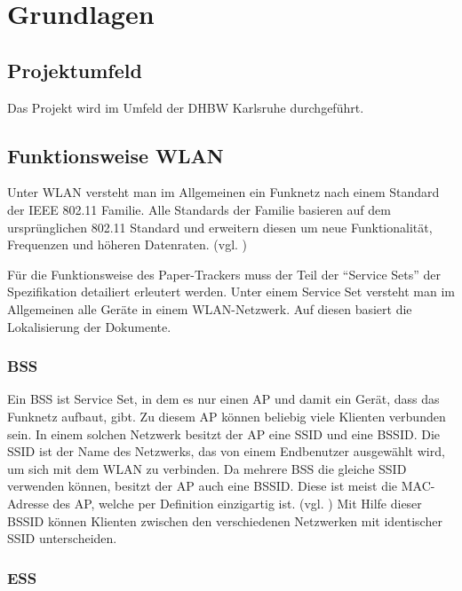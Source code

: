 \chapter{Grundlagen}

\section{Projektumfeld}

Das Projekt wird im Umfeld der \gls{DHBW} Karlsruhe durchgeführt.
\TODO{}

\section{Funktionsweise \gls{WLAN}} \label{sec:grundlagen-wlan}

Unter \gls{WLAN} versteht man im Allgemeinen ein Funknetz nach einem Standard der \gls{IEEE} 802.11 Familie.
Alle Standards der Familie basieren auf dem ursprünglichen 802.11 Standard und erweitern diesen um neue Funktionalität, Frequenzen und höheren Datenraten.
(vgl. \cite{Schnabel2020})

Für die Funktionsweise des Paper-Trackers muss der Teil der \enquote{Service Sets} der Spezifikation detailiert erleutert werden.
Unter einem Service Set versteht man im Allgemeinen alle Geräte in einem \gls{WLAN}-Netzwerk.
Auf diesen basiert die Lokalisierung der Dokumente.

\subsection{\gls{BSS}}

Ein \gls{BSS} ist Service Set, in dem es nur einen \gls{AP} und damit ein Gerät, dass das Funknetz aufbaut, gibt.
Zu diesem \gls{AP} können beliebig viele Klienten verbunden sein.
In einem solchen Netzwerk besitzt der \gls{AP} eine \gls{SSID} und eine \gls{BSSID}.
Die \gls{SSID} ist der Name des Netzwerks, das von einem Endbenutzer ausgewählt wird, um sich mit dem \gls{WLAN} zu verbinden.
Da mehrere \gls{BSS} die gleiche \gls{SSID} verwenden können, besitzt der \gls{AP} auch eine \gls{BSSID}.
Diese ist meist die \gls{MAC}-Adresse des \gls{AP}, welche per Definition einzigartig ist.
(vgl. \cite{Luber2018})
Mit Hilfe dieser \gls{BSSID} können Klienten zwischen den verschiedenen Netzwerken mit identischer \gls{SSID} unterscheiden.

\subsection{\gls{ESS}}

